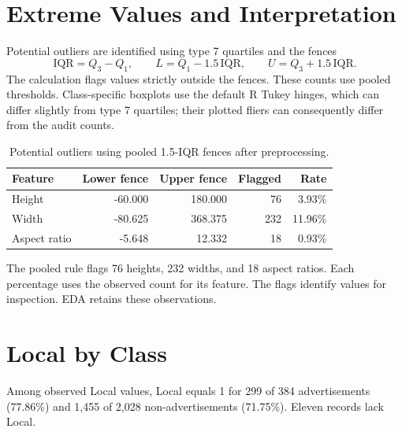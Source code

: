 

\section{Extreme Values and Interpretation}

Potential outliers are identified using type 7 quartiles and the fences
\[
 \mathrm{IQR}=Q_3-Q_1,\qquad
 L=Q_1-1.5\,\mathrm{IQR},\qquad U=Q_3+1.5\,\mathrm{IQR}.
\]
The calculation flags values strictly outside the fences. These counts
use pooled thresholds. Class-specific boxplots use the default R Tukey
hinges, which can differ slightly from type 7 quartiles; their plotted
fliers can consequently differ from the audit counts.

\begin{table}[htbp]
\centering
\small
\caption{Potential outliers using pooled 1.5-IQR fences after preprocessing.}
\label{tab:eda-outliers}
\begin{tabular}{lrrrr}
\toprule
Feature & Lower fence & Upper fence & Flagged & Rate\\
\midrule
Height & -60.000 & 180.000 & 76 & 3.93\%\\
Width & -80.625 & 368.375 & 232 & 11.96\%\\
Aspect ratio & -5.648 & 12.332 & 18 & 0.93\%\\
\bottomrule
\end{tabular}
\end{table}

The pooled rule flags 76 heights, 232 widths, and 18 aspect ratios.
Each percentage uses the observed count for its feature. The flags
identify values for inspection. EDA retains these observations.

\section{Local by Class}
Among observed Local values, Local equals 1 for 299 of 384
advertisements (77.86\%) and 1,455 of 2,028 non-advertisements
(71.75\%). Eleven records lack Local.


